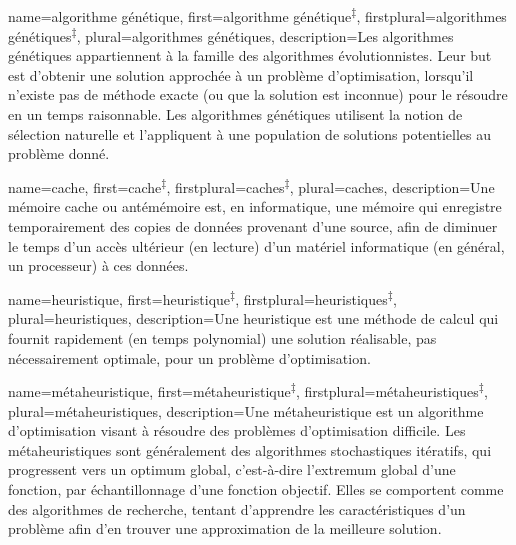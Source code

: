 {
	name={algorithme génétique},
	first={algorithme génétique}\textsuperscript{$\ddagger$}, %
	firstplural={algorithmes génétiques}\textsuperscript{$\ddagger$},
	plural={algorithmes génétiques},
	description={Les algorithmes génétiques appartiennent à la famille des algorithmes évolutionnistes. Leur but est d'obtenir une solution approchée à un problème d'optimisation, lorsqu'il n'existe pas de méthode exacte (ou que la solution est inconnue) pour le résoudre en un temps raisonnable. Les algorithmes génétiques utilisent la notion de sélection naturelle et l'appliquent à une population de solutions potentielles au problème donné.}%
}


{
	name=cache,
	first=cache\textsuperscript{$\ddagger$}, %
	firstplural=caches\textsuperscript{$\ddagger$},
	plural=caches,
	description={Une mémoire cache ou antémémoire est, en informatique, une mémoire qui enregistre temporairement des copies de données provenant d'une source, afin de diminuer le temps d'un accès ultérieur (en lecture) d'un matériel informatique (en général, un processeur) à ces données. \cite{wikipedia-cache}}%
}

{
	name={heuristique},
	first={heuristique}\textsuperscript{$\ddagger$}, %
	firstplural={heuristiques}\textsuperscript{$\ddagger$},
	plural={heuristiques},
	description={Une heuristique est une méthode de calcul qui fournit rapidement (en temps polynomial) une solution réalisable, pas nécessairement optimale, pour un problème d'optimisation.}%
}

{
	name={métaheuristique},
	first={métaheuristique}\textsuperscript{$\ddagger$}, %
	firstplural={métaheuristiques}\textsuperscript{$\ddagger$},
	plural={métaheuristiques},
	description={Une métaheuristique est un algorithme d’optimisation visant à résoudre des problèmes d’optimisation difficile. Les métaheuristiques sont généralement des algorithmes stochastiques itératifs, qui progressent vers un optimum global, c'est-à-dire l'extremum global d'une fonction, par échantillonnage d’une fonction objectif. Elles se comportent comme des algorithmes de recherche, tentant d’apprendre les caractéristiques d’un problème afin d’en trouver une approximation de la meilleure solution.}%
}

